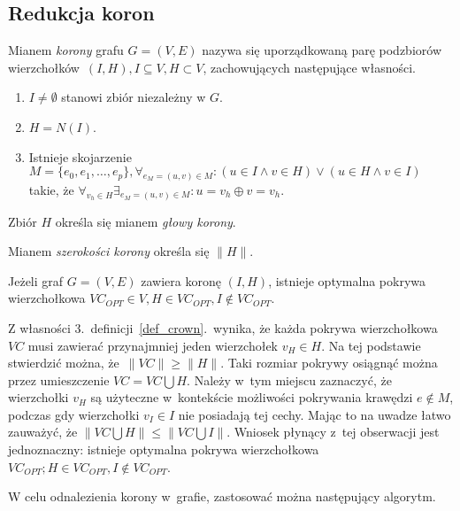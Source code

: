 \subsection{Redukcja koron}\label{ss_kernelization_crown_reduction}
\begin{definition}
  Mianem \emph{korony} grafu $G=(V, E)$ nazywa się uporządkowaną parę
  podzbiorów wierzchołków $(I, H), I \subseteq V, H \subset V$, zachowujących
  następujące własności.
  \begin{enumerate}
    \item $I \neq \emptyset$ stanowi zbiór niezależny w $G$.
    \item $H=N(I)$.
    \item Istnieje skojarzenie $M=\{e_0, e_1, \ldots, e_p\}, \forall_{e_M=(u,v) \in
      M}: (u\in I \land v\in H) \lor (u \in H \land v \in I)$ takie, że
      $\forall_{v_h \in H}\exists_{e_M=(u,v)\in M}: u = v_h \oplus v = v_h$.
  \end{enumerate}
\end{definition}
\begin{definition}
  Zbiór $H$ określa się mianem \emph{głowy korony}.
\end{definition}
\begin{definition}
  Mianem \emph{szerokości korony} określa się $\|H\|$.
\end{definition}
\begin{theorem}
  Jeżeli graf $G=(V,E)$ zawiera koronę $(I,H)$, istnieje optymalna pokrywa 
  wierzchołkowa $VC_{OPT} \in V, H \in VC_{OPT}, I \notin VC_{OPT}$.
\end{theorem}
\begin{bproof}
  Z własności 3.\ definicji~\ref{def_crown}.\ wynika, że każda pokrywa 
  wierzchołkowa $VC$ musi zawierać przynajmniej jeden wierzchołek $v_H \in H$.
  Na tej podstawie stwierdzić można, że $\|VC\|\geq\|H\|$.
  Taki rozmiar pokrywy osiągnąć można przez umieszczenie $VC=VC\bigcup H$.
  Należy w~tym miejscu zaznaczyć, że wierzchołki $v_H$ są użyteczne w~kontekście
  możliwości pokrywania krawędzi $e \notin M$, podczas gdy wierzchołki $v_I \in
  I$ nie posiadają tej cechy.
  Mając to na uwadze łatwo zauważyć, że $\|VC \bigcup H\| \leq \|VC \bigcup
  I\|$.
  Wniosek płynący z~tej obserwacji jest jednoznaczny: istnieje optymalna pokrywa
  wierzchołkowa $VC_{OPT}; H \in VC_{OPT}, I \notin VC_{OPT}$.
\end{bproof}
W celu odnalezienia korony w~grafie, zastosować można następujący algorytm.
